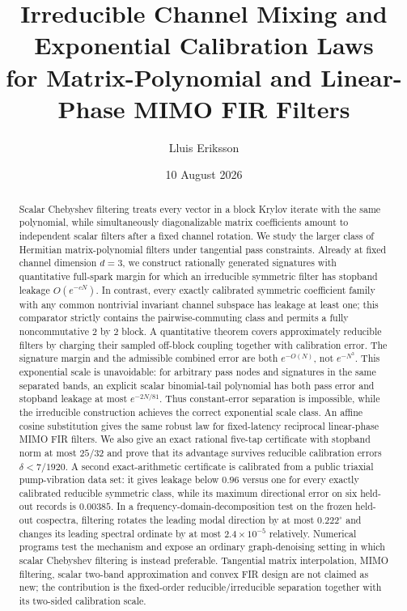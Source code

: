 \documentclass[11pt]{article}
\title{Irreducible Channel Mixing and Exponential Calibration Laws\\
       for Matrix-Polynomial and Linear-Phase MIMO FIR Filters}
\author{Lluis Eriksson}
\date{10 August 2026}
\theoremstyle{remark}
\begin{document}
\maketitle

\begin{abstract}
Scalar Chebyshev filtering treats every vector in a block Krylov iterate with
the same polynomial, while simultaneously diagonalizable matrix coefficients
amount to independent scalar filters after a fixed channel rotation.  We study
the larger class of Hermitian matrix-polynomial filters under tangential pass
constraints.  Already at fixed channel dimension $d=3$, we construct
rationally generated signatures with quantitative full-spark margin for which
an irreducible symmetric filter has stopband leakage $O(e^{-cN})$.  In contrast,
every exactly calibrated symmetric coefficient family with any common
nontrivial invariant channel subspace has leakage at least one; this comparator
strictly contains the pairwise-commuting class and permits a fully
noncommutative $2$ by $2$ block.  A quantitative theorem covers approximately
reducible filters by charging their sampled off-block coupling together with
calibration error.  The signature margin and the admissible combined error are
both $e^{-O(N)}$, not $e^{-N^3}$.  This exponential scale is unavoidable: for
arbitrary pass nodes and signatures in the same separated bands, an explicit
scalar binomial-tail polynomial has both pass error and stopband leakage at
most $e^{-2N/81}$.  Thus constant-error separation is impossible, while the
irreducible construction achieves the correct exponential scale class.  An
affine cosine substitution gives the same robust law for fixed-latency
reciprocal linear-phase MIMO FIR filters.  We also give an exact
rational five-tap certificate with stopband norm at most $25/32$ and prove
that its advantage survives reducible calibration errors
$\delta<7/1920$.  A second exact-arithmetic certificate is calibrated from a
public triaxial pump-vibration data set: it gives leakage below $0.96$ versus
one for every exactly calibrated reducible symmetric class, while its maximum directional
error on six held-out records is $0.00385$.  In a frequency-domain-decomposition
test on the frozen held-out cospectra, filtering rotates the leading modal
direction by at most $0.222^\circ$ and changes its leading spectral ordinate by
at most $2.4\times10^{-5}$ relatively.  Numerical programs test the mechanism
and expose an ordinary graph-denoising setting in which scalar Chebyshev
filtering is instead preferable.  Tangential matrix interpolation, MIMO
filtering, scalar two-band approximation and convex FIR design are not claimed
as new; the contribution is the fixed-order reducible/irreducible separation
together with its two-sided calibration scale.
\end{abstract}
\end{document}

